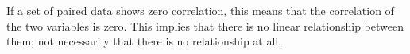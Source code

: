  If a set of paired data shows zero correlation, this means that
the correlation of the two variables is zero. This implies that
there is no linear relationship between them; not necessarily that
there is no relationship at all.
